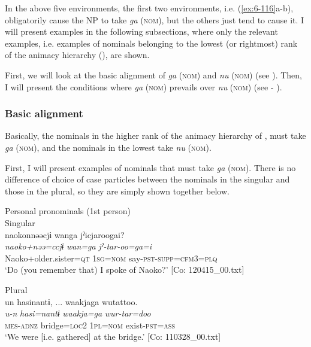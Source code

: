 In the above five environments, the first two environments, i.e. (\ref{ex:6-116}a-b), obligatorily cause the NP to take \textit{ga} (\textsc{nom}), but the others just tend to cause it. I will present examples in the following subsections, where only the relevant examples, i.e. examples of nominals belonging to the lowest (or rightmost) rank of the animacy hierarchy (), are shown.

  First, we will look at the basic alignment of \textit{ga} (\textsc{nom}) and \textit{nu} (\textsc{nom}) (see ). Then, I will present the conditions where \textit{ga} (\textsc{nom}) prevails over \textit{nu} (\textsc{nom}) (see  - ).

\subsubsection{Basic alignment}

Basically, the nominals in the higher rank of the animacy hierarchy of , must take \textit{ga} (\textsc{nom}), and the nominals in the lowest take \textit{nu} (\textsc{nom}).

First, I will present examples of nominals that must take \textit{ga} (\textsc{nom}). There is no difference of choice of case particles between the nominals in the singular and those in the plural, so they are simply shown together below.

\ea\label{ex:6-117}
  Personal pronominals (1st person)\\
 \ea Singular\\
{\TM}
\glll  naokonnəəcjɨ  wanga  jˀicjaroogai?\\
\textit{naoko+nəə=ccjɨ}  \textit{wan=ga}  \textit{jˀ-tar-oo=ga=i}\\
Naoko+older.sister=\textsc{qt}  1\textsc{sg}=\textsc{nom}  say-\textsc{pst}-\textsc{supp}=\textsc{cfm}3=\textsc{plq}\\
\glt ‘Do (you remember that) I spoke of Naoko?’ [Co: 120415\_00.txt]
\z

\ex Plural\\
{\TM}
\glll  un  hasinantɨ, ...  waakjaga  wutattoo.\\
\textit{u-n}  \textit{hasi=nantɨ}  \textit{waakja=ga}  \textit{wur-tar=doo}\\
\textsc{mes}-\textsc{adnz}  bridge=\textsc{loc2}  1\textsc{pl}=\textsc{nom}  exist-\textsc{pst}=\textsc{ass}\\
\glt ‘We were [i.e. gathered] at the bridge.’ [Co: 110328\_00.txt]
\z

